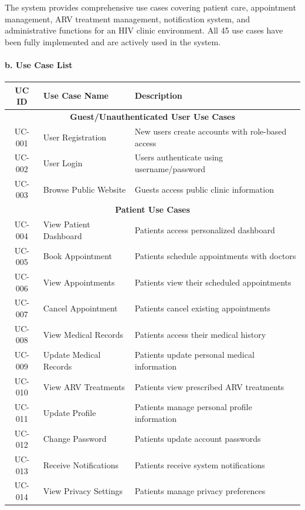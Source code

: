 \documentclass[12pt,a4paper]{article}
\begin{document}
The system provides comprehensive use cases covering patient care, appointment management, ARV treatment management, notification system, and administrative functions for an HIV clinic environment. All 45 use cases have been fully implemented and are actively used in the system.

\paragraph{b. Use Case List}

\begin{longtable}{|c|p{4cm}|p{9cm}|}
\hline
\textbf{UC ID} & \textbf{Use Case Name} & \textbf{Description} \\
\hline
\multicolumn{3}{|c|}{\textbf{Guest/Unauthenticated User Use Cases}} \\
\hline
UC-001 & User Registration & New users create accounts with role-based access \\
\hline
UC-002 & User Login & Users authenticate using username/password \\
\hline
UC-003 & Browse Public Website & Guests access public clinic information \\
\hline
\multicolumn{3}{|c|}{\textbf{Patient Use Cases}} \\
\hline
UC-004 & View Patient Dashboard & Patients access personalized dashboard \\
\hline
UC-005 & Book Appointment & Patients schedule appointments with doctors \\
\hline
UC-006 & View Appointments & Patients view their scheduled appointments \\
\hline
UC-007 & Cancel Appointment & Patients cancel existing appointments \\
\hline
UC-008 & View Medical Records & Patients access their medical history \\
\hline
UC-009 & Update Medical Records & Patients update personal medical information \\
\hline
UC-010 & View ARV Treatments & Patients view prescribed ARV treatments \\
\hline
UC-011 & Update Profile & Patients manage personal profile information \\
\hline
UC-012 & Change Password & Patients update account passwords \\
\hline
UC-013 & Receive Notifications & Patients receive system notifications \\
\hline
UC-014 & View Privacy Settings & Patients manage privacy preferences \\

\end{longtable}
\end{document}
